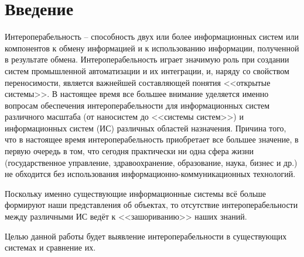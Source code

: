\section*{Введение}
%

Интероперабельность – способность двух или более информационных систем или компонентов к обмену информацией и к использованию информации, полученной в результате обмена. Интероперабельность играет значимую роль при создании систем промышленной автоматизации и их интеграции, и, наряду со свойством переносимости, является важнейшей составляющей понятия <<открытые системы>>. В настоящее время все большее внимание уделяется именно вопросам обеспечения интероперабельности для информационных систем различного масштаба (от наносистем до <<системы систем>>) и информационных систем (ИС) различных областей назначения. Причина того, что в настоящее время интероперабельность приобретает все большее значение, в первую очередь в том, что сегодня практически ни одна сфера жизни (государственное управление, здравоохранение, образование, наука, бизнес и др.) не обходится без использования информационно-коммуникационных технологий.

Поскольку именно существующие информационные системы всё больше формируют наши представления об объектах, то отсутствие интероперабельности между различными ИС ведёт к <<зашориванию>> наших знаний.

Целью данной работы будет выявление интероперабельности в существующих системах и сравнение их.